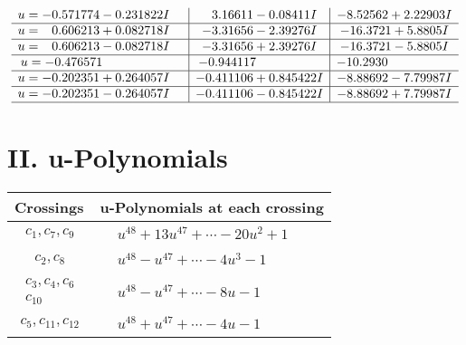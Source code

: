 \documentclass[1p]{elsarticle_modified}
\theoremstyle{definition}
\begin{document}
$$\begin{array}{c|c|c}
\begin{aligned}
u &= -0.571774 - 0.231822 I\end{aligned}
 & \phantom{-}3.16611 - 0.08411 I & -8.52562 + 2.22903 I \\ \hline\begin{aligned}
u &= \phantom{-}0.606213 + 0.082718 I\end{aligned}
 & -3.31656 - 2.39276 I & -16.3721 + 5.8805 I \\ \hline\begin{aligned}
u &= \phantom{-}0.606213 - 0.082718 I\end{aligned}
 & -3.31656 + 2.39276 I & -16.3721 - 5.8805 I \\ \hline\begin{aligned}
u &= -0.476571\phantom{ +0.000000I}\end{aligned}
 & -0.944117\phantom{ +0.000000I} & -10.2930\phantom{ +0.000000I} \\ \hline\begin{aligned}
u &= -0.202351 + 0.264057 I\end{aligned}
 & -0.411106 + 0.845422 I & -8.88692 - 7.79987 I \\ \hline\begin{aligned}
u &= -0.202351 - 0.264057 I\end{aligned}
 & -0.411106 - 0.845422 I & -8.88692 + 7.79987 I\\
 \hline 
 \end{array}$$\newpage
\newpage\renewcommand{\arraystretch}{1}
\centering \section*{ II. u-Polynomials}
\begin{tabular}{m{50pt}|m{274pt}}
Crossings & \hspace{64pt}u-Polynomials at each crossing \\
\hline $$\begin{aligned}c_{1},c_{7},c_{9}\end{aligned}$$&$\begin{aligned}
&u^{48}+13 u^{47}+\cdots-20 u^2+1
\end{aligned}$\\
\hline $$\begin{aligned}c_{2},c_{8}\end{aligned}$$&$\begin{aligned}
&u^{48}- u^{47}+\cdots-4 u^3-1
\end{aligned}$\\
\hline $$\begin{aligned}c_{3},c_{4},c_{6}\\c_{10}\end{aligned}$$&$\begin{aligned}
&u^{48}- u^{47}+\cdots-8 u-1
\end{aligned}$\\
\hline $$\begin{aligned}c_{5},c_{11},c_{12}\end{aligned}$$&$\begin{aligned}
&u^{48}+u^{47}+\cdots-4 u-1
\end{aligned}$\\
\hline
\end{tabular}\newpage\renewcommand{\arraystretch}{1}
\end{document}
